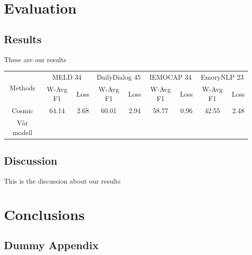 \documentclass[nofilelist]{cslthse-msc}
\begin{document}
\chapter{Evaluation}

\section{Results}

These are our results

\begin{center}
\begin{tabular}{|c|cc|cc|cc|cc|}
\hline
\multirow{2}{*}{Methods} & \multicolumn{2}{c|}{MELD 34}            & \multicolumn{2}{c|}{DailyDialog 45}     & \multicolumn{2}{c|}{IEMOCAP 34}         & \multicolumn{2}{c|}{EmoryNLP 23}        \\ \cline{2-9} 
                         & \multicolumn{1}{c|}{W-Avg F1} & Loss & \multicolumn{1}{c|}{W-Avg F1} & Loss & \multicolumn{1}{c|}{W-Avg F1} & Loss & \multicolumn{1}{c|}{W-Avg F1} & Loss \\ \hline
Cosmic                   & 64.14                         & 2.68 & 60.01                         & 2.94 & 58.77                         & 0.96 & 42.55                         & 2.48 \\ \hline
Vår modell               &                               &      &                               &      &                               &      &                               &      \\ \hline
\end{tabular}
\end{center}


\section{Discussion}
This is the discussion about our results


\chapter{Conclusions}



{}

\begin{appendices}
\chapter{Dummy Appendix}






\printfilelist

\checkoddpage
\ifoddpage
\else
   \newpage
   \thispagestyle{empty}
   \mbox{ }
\fi

\end{appendices}
\end{document}
